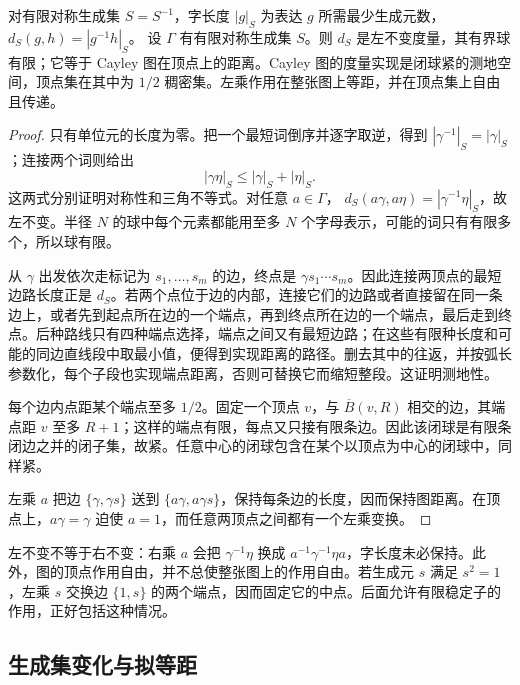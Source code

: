 \begin{proposition}\label{g3:prop:D-cayley-metric}
	对有限对称生成集 \(S=S^{-1}\)，字长度 \(|g|_S\) 为表达 \(g\) 所需最少生成元数，\(d_S(g,h)=|g^{-1}h|_S\)。
	设 \(\Gamma\) 有有限对称生成集 \(S\)。则 \(d_S\) 是左不变度量，其有界球有限；它等于 Cayley 图在顶点上的距离。Cayley 图的度量实现是闭球紧的测地空间，顶点集在其中为 \(1/2\) 稠密集。左乘作用在整张图上等距，并在顶点集上自由且传递。
\end{proposition}
\begin{proof}
	只有单位元的长度为零。把一个最短词倒序并逐字取逆，得到 \(|\gamma^{-1}|_S=|\gamma|_S\)；连接两个词则给出
	\[
		|\gamma\eta|_S\le|\gamma|_S+|\eta|_S.
	\]
	这两式分别证明对称性和三角不等式。对任意 \(a\in\Gamma\)，
	\(d_S(a\gamma,a\eta)=|\gamma^{-1}\eta|_S\)，故左不变。半径 \(N\) 的球中每个元素都能用至多 \(N\) 个字母表示，可能的词只有有限多个，所以球有限。

	从 \(\gamma\) 出发依次走标记为 \(s_1,\ldots,s_m\) 的边，终点是 \(\gamma s_1\cdots s_m\)。因此连接两顶点的最短边路长度正是 \(d_S\)。若两个点位于边的内部，连接它们的边路或者直接留在同一条边上，或者先到起点所在边的一个端点，再到终点所在边的一个端点，最后走到终点。后种路线只有四种端点选择，端点之间又有最短边路；在这些有限种长度和可能的同边直线段中取最小值，便得到实现距离的路径。删去其中的往返，并按弧长参数化，每个子段也实现端点距离，否则可替换它而缩短整段。这证明测地性。

	每个边内点距某个端点至多 \(1/2\)。固定一个顶点 \(v\)，与 \(\overline B(v,R)\) 相交的边，其端点距 \(v\) 至多 \(R+1\)；这样的端点有限，每点又只接有限条边。因此该闭球是有限条闭边之并的闭子集，故紧。任意中心的闭球包含在某个以顶点为中心的闭球中，同样紧。

	左乘 \(a\) 把边 \(\{\gamma,\gamma s\}\) 送到 \(\{a\gamma,a\gamma s\}\)，保持每条边的长度，因而保持图距离。在顶点上，\(a\gamma=\gamma\) 迫使 \(a=1\)，而任意两顶点之间都有一个左乘变换。
\end{proof}

左不变不等于右不变：右乘 \(a\) 会把 \(\gamma^{-1}\eta\) 换成 \(a^{-1}\gamma^{-1}\eta a\)，字长度未必保持。此外，图的顶点作用自由，并不总使整张图上的作用自由。若生成元 \(s\) 满足 \(s^2=1\)，左乘 \(s\) 交换边 \(\{1,s\}\) 的两个端点，因而固定它的中点。后面允许有限稳定子的作用，正好包括这种情况。

\subsection{生成集变化与拟等距}
\label{g3:subsec:D01:02}

